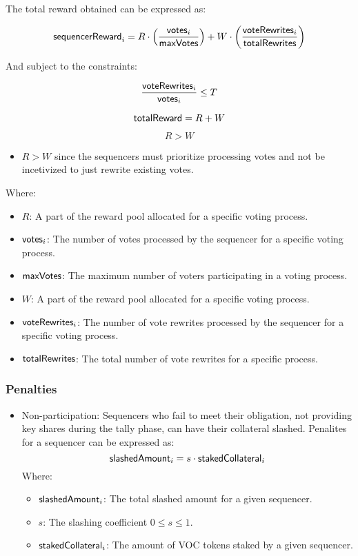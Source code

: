 The total reward obtained can be expressed as:

$$ {\sf{sequencerReward}}_i = R \cdot \left( \frac{{\sf{votes}}_i}{{\sf{maxVotes}}} \right) + W \cdot \left( \frac{{\sf{voteRewrites}}_i}{{\sf{totalRewrites}}}  \right) $$

And subject to the constraints:

$$ \frac{{\sf{voteRewrites}}_i}{{\sf{votes}}_i} \leq T$$

$$ {\sf{totalReward}} = R + W $$

$$ R > W $$

\begin{itemize}
	\item $R > W$ since the sequencers must prioritize processing votes and not be incetivized to just rewrite existing votes.
\end{itemize}

Where:

\begin{itemize}
	\item $R$: A part of the reward pool allocated for a specific voting process.
	\item ${\sf{votes}}_i$: The number of votes processed by the sequencer for a specific voting process.
	\item ${\sf{maxVotes}}$: The maximum number of voters participating in a voting process.
	\item $W$: A part of the reward pool allocated for a specific voting process.
	\item ${\sf{voteRewrites}}_i$: The number of vote rewrites processed by the sequencer for a specific voting process.
	\item ${\sf{totalRewrites}}$: The total number of vote rewrites for a specific process.
\end{itemize}

\subsubsection{Penalties}

\begin{itemize}
	\item Non-participation: Sequencers who fail to meet their obligation, not providing key shares during the tally phase, can have their collateral slashed.
	Penalites for a sequencer can be expressed as:
	$$ {\sf{slashedAmount}}_i = s \cdot {\sf{stakedCollateral}}_i $$
	Where:
	\begin{itemize}
		\item ${\sf{slashedAmount}}_i$: The total slashed amount for a given sequencer.
		\item $s$: The slashing coefficient $0 \leq s \leq 1$.
		\item ${\sf{stakedCollateral}}_i$: The amount of VOC tokens staked by a given sequencer.
	\end{itemize}
\end{itemize}

